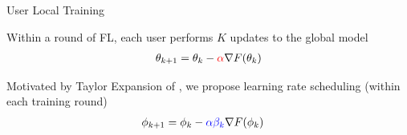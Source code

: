 \documentclass{beamer}
\begin{document}
\begin{frame}{User Local Training}

    Within a round of FL, each user performs $K$ updates to the global model
    \begin{align}
        \theta_{k + 1} = \theta_{k} - \textcolor{red}{\alpha} \nabla F(\theta_{k}) 
    \end{align}

    Motivated by Taylor Expansion of \textcite{reptile}, we propose learning rate scheduling (within each training round)
    \begin{align}
        & \phi_{k + 1} = \phi_{k} - \textcolor{blue}{\alpha \beta_k} \nabla F(\phi_{k}) \label{eq: lr-decay} 
    \end{align}

\end{frame}
\end{document}
